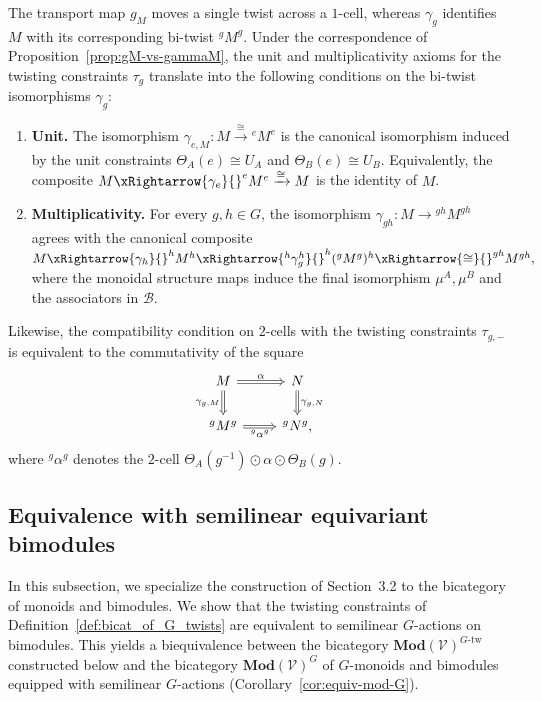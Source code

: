 \documentclass[11pt,oneside]{amsart}
\numberwithin{equation}{section}
\numberwithin{figure}{section}
\theoremstyle{plain}
\theoremstyle{definition}
\theoremstyle{remark}
\begin{document}
\begin{remark}\label{rem:naturality-is-equivariance}
The transport map \(g_M\) moves a single twist across a \(1\)-cell, whereas
\(\gamma_g\) identifies \(M\) with its corresponding bi-twist \({}^gM^g\).
Under the correspondence of Proposition~\ref{prop:gM-vs-gammaM}, the unit and
multiplicativity axioms for the twisting constraints \(\tau_{g}\) translate
into the following conditions on the bi-twist isomorphisms \(\gamma_g\):
\begin{enumerate}
    \item[(1)] \textbf{Unit.} The isomorphism
\(
\gamma_{e,M}:M\xrightarrow{\cong}{}^eM^e
\)
is the canonical isomorphism induced by the unit constraints
$\Theta_A(e)\cong U_A$ and $\Theta_B(e)\cong U_B$.
Equivalently, the composite
\(M\xRightarrow{\gamma_{e}}{}^eM^e\xrightarrow{\cong}M
\)
is the identity of $M$.

    \item[(2)] \textbf{Multiplicativity.} For every \(g,h\in G\), the isomorphism
    \(\gamma_{gh}\colon M\to {}^{gh}M^{gh}\) agrees with the canonical composite
    \(
    M \xRightarrow{\gamma_{h}} {}^hM^h
    \xRightarrow{{}^h\gamma_g^h} {}^h({}^gM^g)^h
    \xRightarrow{\cong} {}^{gh}M^{gh},
    \)
    where the monoidal structure maps induce the final isomorphism
    \(\mu^A,\mu^B\) and the associators in \(\mathcal B\).
\end{enumerate}

Likewise, the compatibility condition on \(2\)-cells with the twisting
constraints \(\tau_{g,-}\) is equivalent to the commutativity of the square
\begin{equation}\label{equiv:constraint}
\begin{tikzcd}
M \arrow[r,Rightarrow, "\alpha"]
  \arrow[d,Rightarrow,"\gamma_{g,M}"']
& N \arrow[d,Rightarrow,"\gamma_{g,N}"] \\
{}^gM^g \arrow[r,Rightarrow,"{}^g\alpha^g"']
& {}^gN^g,
\end{tikzcd}
\end{equation}
where \({}^g\alpha^g\) denotes the \(2\)-cell
\(
\Theta_A(g^{-1})\odot \alpha \odot \Theta_B(g).
\)
\end{remark}



\subsection{Equivalence with semilinear equivariant bimodules}
In this subsection, we specialize the construction of Section~3.2
to the bicategory of monoids and bimodules. We show that the twisting
constraints of Definition~\ref{def:bicat_of_G_twists} are equivalent
to semilinear \(G\)-actions on bimodules. This yields a biequivalence
between the bicategory
\(\mathbf{Mod}(\mathcal V)^{G\text{-tw}}\) constructed below and the
bicategory \(\mathbf{Mod}(\mathcal V)^G\) of \(G\)-monoids and
bimodules equipped with semilinear \(G\)-actions
(Corollary~\ref{cor:equiv-mod-G}).
\end{document}
